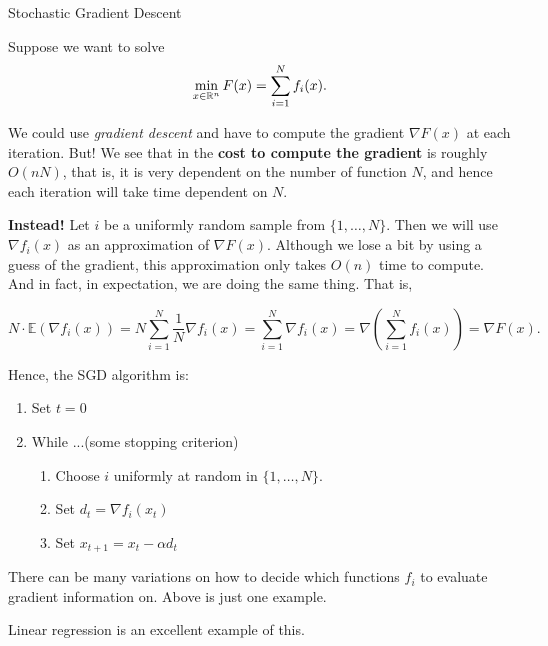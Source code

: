 \documentclass[../open-optimization/open-optimization.tex]{subfiles}
\begin{document}
\begin{general}{Stochastic Gradient Descent}{}

Suppose we want to solve
\begin{equation}
\min_{x \in {\mathbb{R}}^n} F(x) = \sum_{i=1}^N f_i(x).
\end{equation}

We could use \emph{gradient descent} and have to compute the gradient $\nabla F(x)$ at each iteration.  But!   We see that in the \textbf{cost to compute the gradient} is roughly $O(nN)$, that is, it is very dependent on the number of function $N$, and hence each iteration will take time dependent on $N$.

\textbf{Instead!} Let $i$ be a uniformly random sample from $\{1, \dots, N\}$.  Then we will use $\nabla f_i(x)$ as an approximation of $\nabla F(x)$.  Although we lose a bit by using a guess of the gradient, this approximation only takes $O(n)$ time to compute.  And in fact, in expectation, we are doing the same thing.  That is,

$$
N\cdot  \mathbb{E}( \nabla f_i(x)) = N \sum_{i=1}^N \frac{1}{N} \nabla f_i(x) =  \sum_{i=1}^N\nabla f_i(x) = \nabla \left(  \sum_{i=1}^N   f_i(x)\right) = \nabla F(x).
$$


Hence, the SGD algorithm is:

\begin{enumerate}
\item Set $t = 0$
\item While ...(some stopping criterion)
\begin{enumerate}
\item Choose $i$ uniformly at random in $\{1, \dots, N\}$.
\item Set $d_t = \nabla f_i(x_t)$
\item Set $x_{t+1} = x_t - \alpha d_t$
\end{enumerate}
\end{enumerate}

There can be many variations on how to decide which functions $f_i$ to evaluate gradient information on.  Above is just one example.

\end{general}
 
 
 
 Linear regression is an excellent example of this.  
\end{document}

